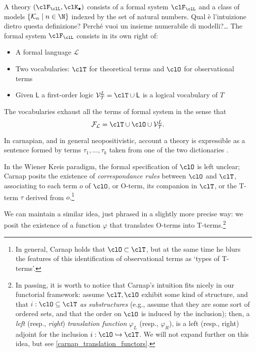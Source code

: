 \begin{definition}
	A theory $(\clF_\clL, \clK_\bullet)$ consists of a formal system $\clF_\clL$ and a class of models $\{\mathcal{K}_n \mid n \in \N \}$ indexed by the set of natural numbers. 
	{\color{red} Qual è l'intuizione dietro questa definizione? Perché vuoi un insieme numerabile di modelli?\dots}
	The formal system $\clF_\clL$ consists in its own right of:
	\begin{itemize}
		\item A formal language $\mathcal{L}$ 
		\item Two vocabularies: $\clT$ for theoretical terms and $\clO$ for observational terms 
		\item Given $\mathsf{L}$ a first-order logic $\mathcal{V}_{\mathcal{T}}^L = \clT \cup \mathsf{L}$ is a logical vocabulary of $T$
	\end{itemize}    
\end{definition}
The vocabularies exhaust all the terms of formal system in the sense that 
\[\mathcal{F_L} = \clT \cup \clO \cup \mathcal{V}_{\mathcal{T}}^L.\]

In carnapian, and in general neopositivistic, account a theory is expressible as a sentence formed by terms $\tau_1, \dots, \tau_k$ taken from one of the two dictionaries \cite{?}. 

In the Wiener Kreis paradigm, the formal specification of $\clO$ is left unclear; Carnap \cite{} posits the existence of \emph{correspondance rules} between $\clO$ and $\clT$, associating to each term $o$ of $\clO$, or O-term, its companion in $\clT$, or the T-term $\tau$ derived from $o$.\footnote{In general, Carnap holds that $\clO \subset \clT$, but at the same time he blurs the features of this identification of observational terms as `types of T-terms'.}

We can maintain a similar idea, just phrased in a slightly more precise way: we posit the existence of a function $\varphi$ that translates O-terms into T-terms.\footnote{In passing, it is worth to notice that Carnap's intuition fits nicely in our functorial framework: assume $\clT, \clO$ exhibit some kind of structure, and that $i : \clO\subseteq\clT$ \emph{as substructures} (e.g., assume that they are some sort of ordered sets, and that the order on $\clO$ is induced by the inclusion); then, a \emph{left} (resp., \emph{right}) \emph{translation function} $\varphi_L$ (resp., $\varphi_R$), is a left (resp., right) adjoint for the inclusion $i : \clO\hookrightarrow \clT$. We will not expand further on this idea, but see \autoref{carnap_translation_functors}.}

